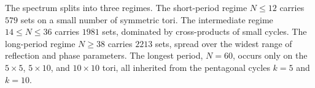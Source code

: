 \par
The spectrum splits into three regimes. The short-period regime
$N \le 12$ carries $579$ sets on a small number
of symmetric tori. The intermediate regime $14 \le N \le 36$
carries $1981$ sets, dominated by cross-products of
small cycles. The long-period regime $N \ge 38$ carries
$2213$ sets, spread over the widest range of
reflection and phase parameters. The longest period, $N = 60$,
occurs only on the $5 \times 5$, $5 \times 10$, and
$10 \times 10$ tori, all inherited from the pentagonal cycles
$k = 5$ and $k = 10$.

